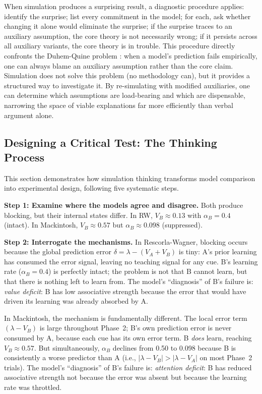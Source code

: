 \documentclass[fleqn,10pt]{wlscirep}
\begin{document}
\begin{linenumbers}
When simulation produces a surprising result, a diagnostic procedure applies: identify the surprise; list every commitment in the model; for each, ask whether changing it alone would eliminate the surprise; if the surprise traces to an auxiliary assumption, the core theory is not necessarily wrong; if it persists across all auxiliary variants, the core theory is in trouble. This procedure directly confronts the Duhem-Quine problem \citep{duhem1954aim}: when a model's prediction fails empirically, one can always blame an auxiliary assumption rather than the core claim. Simulation does not solve this problem (no methodology can), but it provides a structured way to investigate it. By re-simulating with modified auxiliaries, one can determine which assumptions are load-bearing and which are dispensable, narrowing the space of viable explanations far more efficiently than verbal argument alone.

\subsection{Designing a Critical Test: The Thinking Process}

This section demonstrates how simulation thinking transforms model comparison into experimental design, following five systematic steps.

\textbf{Step 1: Examine where the models agree and disagree.} Both produce blocking, but their internal states differ. In RW, $V_B \approx 0.13$ with $\alpha_B = 0.4$ (intact). In Mackintosh, $V_B \approx 0.57$ but $\alpha_B \approx 0.098$ (suppressed).

\textbf{Step 2: Interrogate the mechanisms.} In Rescorla-Wagner, blocking occurs because the global prediction error $\delta = \lambda - (V_A + V_B)$ is tiny: A's prior learning has consumed the error signal, leaving no teaching signal for any cue. B's learning rate ($\alpha_B = 0.4$) is perfectly intact; the problem is not that B cannot learn, but that there is nothing left to learn from. The model's ``diagnosis'' of B's failure is: \emph{value deficit}: B has low associative strength because the error that would have driven its learning was already absorbed by A.

In Mackintosh, the mechanism is fundamentally different. The local error term $(\lambda - V_B)$ is large throughout Phase~2; B's own prediction error is never consumed by A, because each cue has its own error term. B \emph{does} learn, reaching $V_B \approx 0.57$. But simultaneously, $\alpha_B$ declines from 0.50 to 0.098 because B is consistently a worse predictor than A (i.e., $|\lambda - V_B| > |\lambda - V_A|$ on most Phase~2 trials). The model's ``diagnosis'' of B's failure is: \emph{attention deficit}: B has reduced associative strength not because the error was absent but because the learning rate was throttled.


\end{linenumbers}
\end{document}
